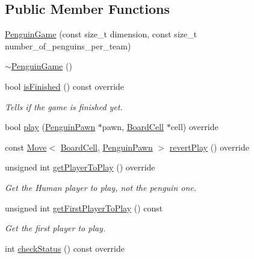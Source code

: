 \subsection*{Public Member Functions}
\begin{DoxyCompactItemize}
\item 
\hyperlink{classgame_1_1penguin_1_1_penguin_game_ad5bc5305347a5c28df1f41407e53303c}{Penguin\+Game} (const size\+\_\+t dimension, const size\+\_\+t number\+\_\+of\+\_\+penguins\+\_\+per\+\_\+team)
\item 
\hyperlink{classgame_1_1penguin_1_1_penguin_game_aac05bdf14bf051096106ec7a0775c3ea}{$\sim$\+Penguin\+Game} ()
\item 
bool \hyperlink{classgame_1_1penguin_1_1_penguin_game_ae5e55157da5e8a1ed2ccc2c9cbbad50d}{is\+Finished} () const override
\begin{DoxyCompactList}\small\item\em Tells if the game is finished yet. \end{DoxyCompactList}\item 
bool \hyperlink{classgame_1_1penguin_1_1_penguin_game_aa7fe86e287d704d3bc597893134bd408}{play} (\hyperlink{classgame_1_1penguin_1_1_penguin_pawn}{Penguin\+Pawn} $\ast$pawn, \hyperlink{classgame_1_1penguin_1_1_board_cell}{Board\+Cell} $\ast$cell) override
\item 
const \hyperlink{structgame_1_1_move}{Move}$<$ \hyperlink{classgame_1_1penguin_1_1_board_cell}{Board\+Cell}, \hyperlink{classgame_1_1penguin_1_1_penguin_pawn}{Penguin\+Pawn} $>$ \hyperlink{classgame_1_1penguin_1_1_penguin_game_a16aabdfdf43ad7b5b417b58eb593e063}{revert\+Play} () override
\item 
unsigned int \hyperlink{classgame_1_1penguin_1_1_penguin_game_aac449b76f27098b1d2218cc51e7f70b4}{get\+Player\+To\+Play} () override
\begin{DoxyCompactList}\small\item\em Get the Human player to play, not the penguin one. \end{DoxyCompactList}\item 
unsigned int \hyperlink{classgame_1_1penguin_1_1_penguin_game_a445296f56e5a823ce9b9e44610734d70}{get\+First\+Player\+To\+Play} () const
\begin{DoxyCompactList}\small\item\em Get the first player to play. \end{DoxyCompactList}\item 
int \hyperlink{classgame_1_1penguin_1_1_penguin_game_af255dc5b05ef5244ac864d4aa2d3be2e}{check\+Status} () const override

\end{DoxyCompactItemize}
